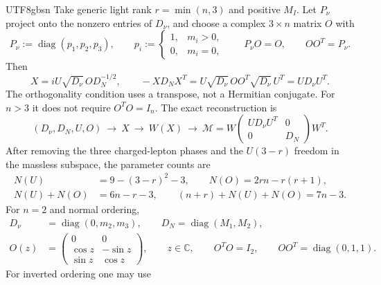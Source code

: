 \documentclass[11pt,a4paper,oneside]{report}
\begin{document}
\begin{CJK*}{UTF8}{gbsn}
Take generic light rank $r=\min(n,3)$ and positive $M_I$. Let $P_\nu$ project onto the nonzero entries of $D_\nu$, and choose a complex $3\times n$ matrix $O$ with
\begin{equation*}
P_\nu:=\operatorname{diag}(p_1,p_2,p_3),\qquad
p_i:=\begin{cases}1,&m_i>0,\\0,&m_i=0,\end{cases}
\qquad P_\nu O=O,\qquad OO^T=P_\nu.
\tag{6.27}\label{eq:6.27}
\end{equation*}
Then
\begin{equation*}
{\displaystyle X=iU\sqrt{D_\nu}\,OD_N^{-1/2}},\qquad
-XD_NX^T=U\sqrt{D_\nu}\,OO^T\sqrt{D_\nu}\,U^T=UD_\nu U^T.
\tag{6.28}\label{eq:6.28}
\end{equation*}
The orthogonality condition uses a transpose, not a Hermitian conjugate. For $n>3$ it does not require $O^TO=I_n$. The exact reconstruction is
\begin{equation*}
(D_\nu,D_N,U,O)\ \longrightarrow\ X\ \longrightarrow\ W(X)
\ \longrightarrow\
\mathcal M=W\begin{pmatrix}UD_\nu U^T&0\\0&D_N\end{pmatrix}W^T.
\tag{6.29}\label{eq:6.29}
\end{equation*}
After removing the three charged-lepton phases and the $U(3-r)$ freedom in the massless subspace, the parameter counts are
\begin{equation*}
\begin{aligned}
N(U)&=9-(3-r)^2-3,\qquad
N(O)=2rn-r(r+1),\\
N(U)+N(O)&=6n-r-3,\qquad
(n+r)+N(U)+N(O)=7n-3.
\end{aligned}
\tag{6.30}\label{eq:6.30}
\end{equation*}
For $n=2$ and normal ordering,
\begin{equation*}
\begin{aligned}
D_\nu&=\operatorname{diag}(0,m_2,m_3),\qquad
D_N=\operatorname{diag}(M_1,M_2),\\
O(z)&=\begin{pmatrix}0&0\\\cos z&-\sin z\\\sin z&\cos z\end{pmatrix},\qquad
z\in\mathbb C,\qquad O^TO=I_2,\qquad OO^T=\operatorname{diag}(0,1,1).
\end{aligned}
\tag{6.31}\label{eq:6.31}
\end{equation*}
For inverted ordering one may use

\end{CJK*}
\end{document}
